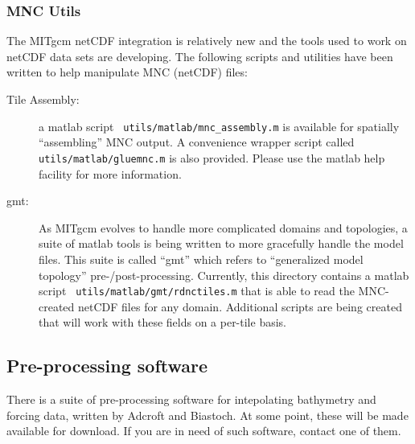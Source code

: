 \subsubsection{MNC Utils}

The MITgcm netCDF integration is relatively new and the tools used to
work on netCDF data sets are developing.  The following scripts and
utilities have been written to help manipulate MNC (netCDF) files:
\begin{description}
\item[Tile Assembly:] a matlab script {\tt
    utils/matlab/mnc\_assembly.m} is available for spatially
  ``assembling'' MNC output.  A convenience wrapper script called {\tt
    utils/matlab/gluemnc.m} is also provided.  Please use the matlab
  help facility for more information.

\item[gmt:] As MITgcm evolves to handle more complicated domains and
  topologies, a suite of matlab tools is being written to more
  gracefully handle the model files.  This suite is called ``gmt''
  which refers to ``generalized model topology'' pre-/post-processing.
  Currently, this directory contains a matlab script {\tt
    utils/matlab/gmt/rdnctiles.m} that is able to read the MNC-created
  netCDF files for any domain.  Additional scripts are being created
  that will work with these fields on a per-tile basis.

\end{description}


\subsection{Pre-processing software}

There is a suite of pre-processing software for intepolating
bathymetry and forcing data, written by Adcroft and Biastoch. At some
point, these will be made available for download. If you are in need
of such software, contact one of them.

